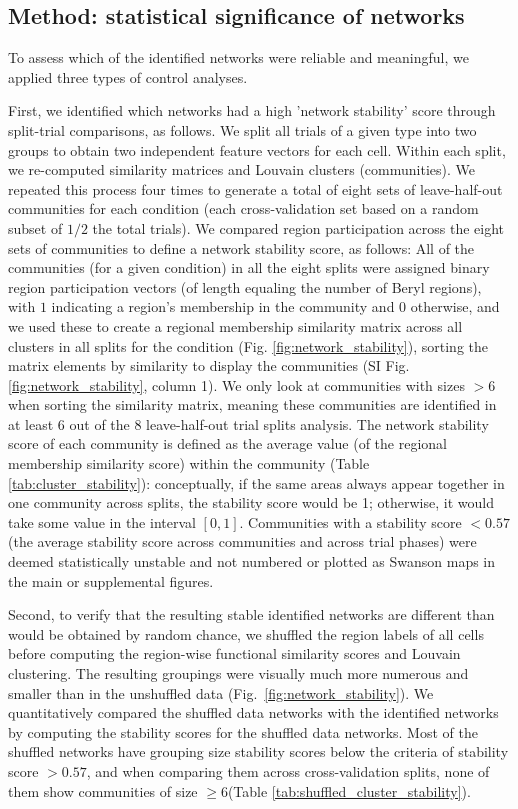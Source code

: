 \subsection{Method: statistical significance of networks}
To assess which of the identified networks were reliable and meaningful, we applied three types of control analyses. 

First, we identified which networks had a high 'network stability' score through split-trial comparisons, as follows. We split all trials of a given type into two groups to obtain two independent feature vectors for each cell. Within each split, we re-computed similarity matrices and Louvain clusters (communities). We repeated this process four times to generate a total of eight sets of leave-half-out communities for each condition (each cross-validation set based on a random subset of $1/2$ the total trials). We compared region participation across the eight sets of communities to define a network stability score, as follows: All of the communities (for a given condition) in all the eight splits were assigned binary region participation vectors (of length equaling the number of Beryl regions), with $1$ indicating a region's membership in the community and $0$ otherwise, and we used these to create a regional membership similarity matrix across all clusters in all splits for the condition (Fig. \ref{fig:network_stability}), sorting the matrix elements by similarity to display the communities (SI Fig. \ref{fig:network_stability}, column 1). We only look at communities with sizes $>6$ when sorting the similarity matrix, meaning these communities are identified in at least 6 out of the 8 leave-half-out trial splits analysis. The network stability score of each community is defined as the average value (of the regional membership similarity score) within the community (Table \ref{tab:cluster_stability}): conceptually, if the same areas always appear together in one community across splits, the stability score would be 1; otherwise, it would take some value in the interval $[0,1]$. Communities with a stability score $<0.57$ (the average stability score across communities and across trial phases) were deemed statistically unstable and not numbered or plotted as Swanson maps in the main or supplemental figures. 

Second, to verify that the resulting stable identified networks are different than would be obtained by random chance, we shuffled the region labels of all cells before computing the region-wise functional similarity scores and Louvain clustering. 
The resulting groupings were visually much more numerous and smaller than in the unshuffled data (Fig.~\ref{fig:network_stability}). We quantitatively compared the shuffled data networks with the identified networks by computing the stability scores for the shuffled data networks. Most of the shuffled networks have grouping size stability scores below the criteria of stability score $>0.57$, and when comparing them across cross-validation splits, none of them show communities of size $\geq 6$(Table \ref{tab:shuffled_cluster_stability}).

